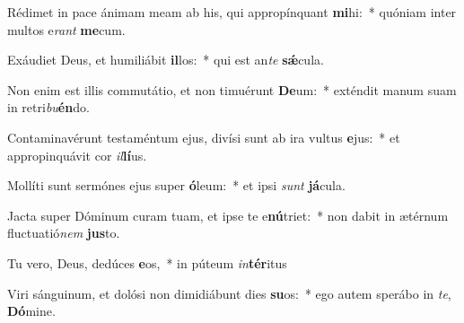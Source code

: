 \item Rédimet in pace ánimam meam ab his, qui appropínquant \textbf{mi}hi:~* quóniam inter multos e\textit{rant} \textbf{me}cum.
\item Exáudiet Deus, et humiliábit \textbf{il}los:~* qui est an\textit{te} \textbf{sǽ}cula.
\item Non enim est illis commutátio, et non timuérunt \textbf{De}um:~* exténdit manum suam in retri\textit{bu}\textbf{én}do.
\item Contaminavérunt testaméntum ejus, divísi sunt ab ira vultus \textbf{e}jus:~* et appropinquávit cor \textit{il}\textbf{lí}us.
\item Mollíti sunt sermónes ejus super \textbf{ó}leum:~* et ipsi \textit{sunt} \textbf{já}cula.
\item Jacta super Dóminum curam tuam, et ipse te e\textbf{nú}triet:~* non dabit in ætérnum fluctuatió\textit{nem} \textbf{jus}to.
\item Tu vero, Deus, dedúces \textbf{e}os,~* in púteum \textit{in}\textbf{tér}itus
\item Viri sánguinum, et dolósi non dimidiábunt dies \textbf{su}os:~* ego autem sperábo in \textit{te}, \textbf{Dó}mine.
